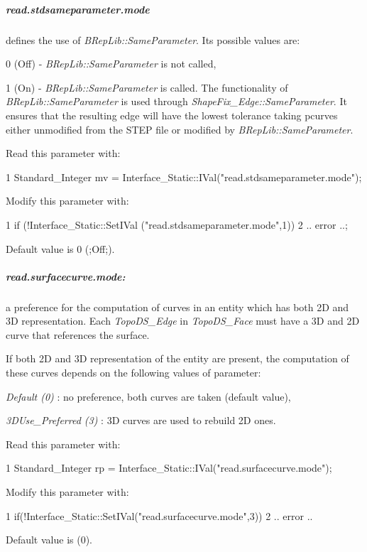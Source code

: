 \subparagraph*{read.\+stdsameparameter.\+mode}

defines the use of {\itshape B\+Rep\+Lib\+::\+Same\+Parameter}. Its possible values are\+:


\begin{DoxyItemize}
\item 0 (Off) -\/ {\itshape B\+Rep\+Lib\+::\+Same\+Parameter} is not called,
\item 1 (On) -\/ {\itshape B\+Rep\+Lib\+::\+Same\+Parameter} is called. The functionality of {\itshape B\+Rep\+Lib\+::\+Same\+Parameter} is used through {\itshape Shape\+Fix\+\_\+\+Edge\+::\+Same\+Parameter}. It ensures that the resulting edge will have the lowest tolerance taking pcurves either unmodified from the S\+T\+EP file or modified by {\itshape B\+Rep\+Lib\+::\+Same\+Parameter}.
\end{DoxyItemize}

Read this parameter with\+: 
\begin{DoxyCode}
1 Standard\_Integer mv = Interface\_Static::IVal("read.stdsameparameter.mode"); 
\end{DoxyCode}
 Modify this parameter with\+: 
\begin{DoxyCode}
1 if (!Interface\_Static::SetIVal ("read.stdsameparameter.mode",1)) 
2 .. error ..; 
\end{DoxyCode}
 Default value is 0 (;Off;).

\subparagraph*{read.\+surfacecurve.\+mode\+:}

a preference for the computation of curves in an entity which has both 2D and 3D representation. Each {\itshape Topo\+D\+S\+\_\+\+Edge} in {\itshape Topo\+D\+S\+\_\+\+Face} must have a 3D and 2D curve that references the surface.

If both 2D and 3D representation of the entity are present, the computation of these curves depends on the following values of parameter\+:
\begin{DoxyItemize}
\item {\itshape Default (0)} \+: no preference, both curves are taken (default value),
\item {\itshape 3\+D\+Use\+\_\+\+Preferred (3)} \+: 3D curves are used to rebuild 2D ones.
\end{DoxyItemize}

Read this parameter with\+: 
\begin{DoxyCode}
1 Standard\_Integer rp = Interface\_Static::IVal("read.surfacecurve.mode"); 
\end{DoxyCode}
 Modify this parameter with\+: 
\begin{DoxyCode}
1 if(!Interface\_Static::SetIVal("read.surfacecurve.mode",3))  
2 .. error .. 
\end{DoxyCode}
 Default value is (0).

